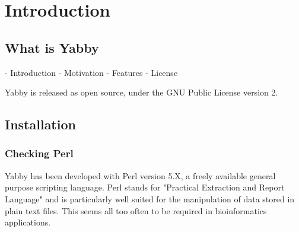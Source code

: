 

\setcounter{section}{0}

\chapter{Introduction}

\section{What is Yabby}

- Introduction
- Motivation
- Features
- License

Yabby is released as open source, under the GNU Public License
version 2.

\section{Installation}

\subsection{Checking Perl}


Yabby has been developed with Perl version 5.X, a freely available
general purpose scripting language. Perl stands for "Practical
Extraction and Report Language" and is particularly well suited for
the manipulation of data stored in plain text files. This seems
all too often to be required in bioinformatics applications.

